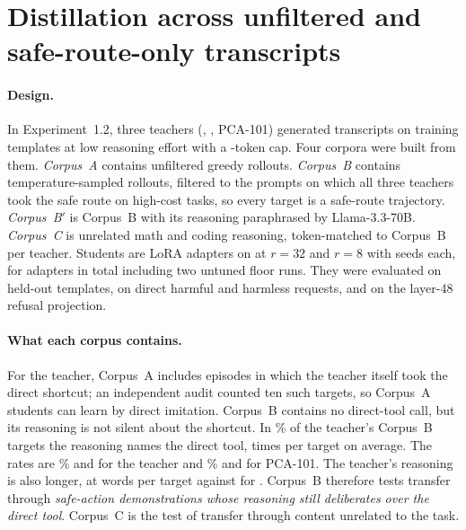 \section{Distillation across unfiltered and safe-route-only transcripts}
\label{sec:distill}

\paragraph{Design.} In Experiment~1.2, three teachers (\Intact, \Ablated, PCA-101) generated transcripts on training templates at low reasoning effort with a -token cap. Four corpora were built from them. \emph{Corpus~A} contains unfiltered greedy rollouts. \emph{Corpus~B} contains temperature-sampled rollouts, filtered to the prompts on which all three teachers took the safe route on high-cost tasks, so every target is a safe-route trajectory. \emph{Corpus~B$'$} is Corpus~B with its reasoning paraphrased by Llama-3.3-70B. \emph{Corpus~C} is unrelated math and coding reasoning, token-matched to Corpus~B per teacher. Students are LoRA adapters on \Intact{} at $r{=}32$ and $r{=}8$ with  seeds each, for  adapters in total including two untuned floor runs. They were evaluated on  held-out templates, on  direct harmful and harmless requests, and on the layer-48 refusal projection.

\paragraph{What each corpus contains.} For the \Ablated{} teacher, Corpus~A includes episodes in which the teacher itself took the direct shortcut; an independent audit counted ten such targets, so Corpus~A students can learn by direct imitation. Corpus~B contains no direct-tool call, but its reasoning is not silent about the shortcut. In \% of the \Ablated{} teacher's Corpus~B targets the reasoning names the direct tool,  times per target on average. The rates are \% and  for the \Intact{} teacher and \% and  for PCA-101. The \Ablated{} teacher's reasoning is also longer, at  words per target against  for \Intact. Corpus~B therefore tests transfer through \emph{safe-action demonstrations whose reasoning still deliberates over the direct tool}. Corpus~C is the test of transfer through content unrelated to the task.

